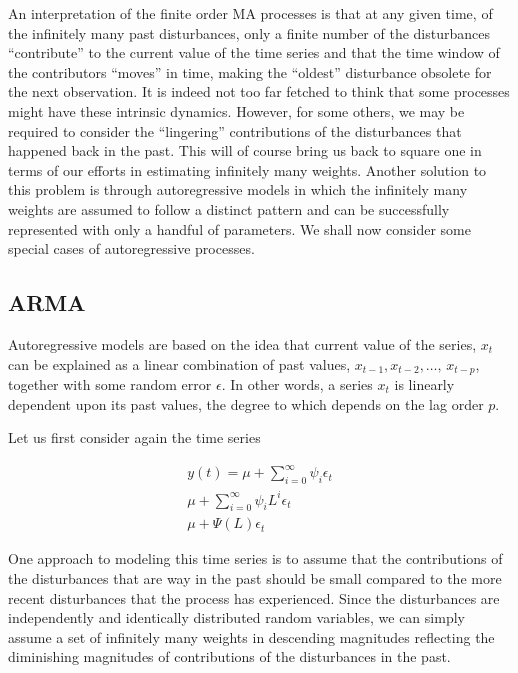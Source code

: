 \documentclass[
  11pt,
]{article}
\begin{document}
An interpretation of the finite order MA processes is that at any given
time, of the infinitely many past disturbances, only a finite number of
the disturbances ``contribute'' to the current value of the time series
and that the time window of the contributors ``moves'' in time, making
the ``oldest'' disturbance obsolete for the next observation. It is
indeed not too far fetched to think that some processes might have these
intrinsic dynamics. However, for some others, we may be required to
consider the ``lingering'' contributions of the disturbances that
happened back in the past. This will of course bring us back to square
one in terms of our efforts in estimating infinitely many weights.
Another solution to this problem is through autoregressive models in
which the infinitely many weights are assumed to follow a distinct
pattern and can be successfully represented with only a handful of
parameters. We shall now consider some special cases of autoregressive
processes.

\hypertarget{arma}{%
\subsection{ARMA}\label{arma}}

Autoregressive models are based on the idea that current value of the
series, \(x_{t}\) can be explained as a linear combination of past
values, \(x_{t-1}, x_{t-2}, \ldots, \, x_{t-p}\), together with some
random error \(\epsilon\). In other words, a series \(x_{t}\) is
linearly dependent upon its past values, the degree to which depends on
the lag order \(p\).

Let us first consider again the time series

\begin{gather*}
y(t) = \mu + \sum\limits_{i= 0}^{\infty}\psi_{i}\epsilon_{t} \\[8pt]
\mu + \sum\limits_{i=0}^{\infty}\psi_{i}L^{i}\epsilon_{t} \\[8pt]
\mu + \Psi(L)\epsilon_{t}
\end{gather*}

One approach to modeling this time series is to assume that the
contributions of the disturbances that are way in the past should be
small compared to the more recent disturbances that the process has
experienced. Since the disturbances are independently and identically
distributed random variables, we can simply assume a set of infinitely
many weights in descending magnitudes reflecting the diminishing
magnitudes of contributions of the disturbances in the past.
\end{document}
